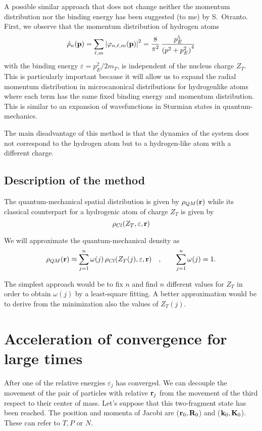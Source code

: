  A possible similar approach that does not change neither the momentum
distribution nor the binding energy has been suggested (to me) by S.~Otranto. First, we observe
that the momentum distribution of hydrogen atoms
\begin{equation}\label{Q:class-momen-distr-hydro}
  \tilde{\rho}_{n}(\mathbf{p}) = \sum_{\ell, m} \left| \varphi_{n,\ell,m}(\mathbf{p})\right|^{2} 
  = \frac{8 }{\pi^{2}} \, \frac{p_{E}^{5}}{\left( p^{2} + p_{E}^{2} \right)^{4}}
\end{equation}
with the binding energy $\varepsilon=p_{E}^{2}/2 m_{T}$, is independent of the
nucleus charge $Z_{T}$. This is particularly important because it will allow us
to expand the radial momentum distribution in microcanonical distributions for
hydrogenlike atoms where each term has the same fixed binding energy and
momentum distribution. This is similar to an expansion of wavefunctions in
Sturmian states in quantum-mechanics.

The main disadvantage of this method is that the dynamics of the system does not
correspond to the hydrogen atom but to a hydrogen-like atom with a different
charge.

\subsection{Description of the method}
\label{S:description-method}

The quantum-mechanical spatial distribution is given by $\rho_{QM}(\mathbf{r})$
while its classical counterpart for a hydrogenic atom of charge $Z_{T}$ is given by
\begin{equation}\label{Q:class-spati-distr-hydro}
  \rho_{Cl}(Z_{T}, \varepsilon, \mathbf{r})
\end{equation}

We will approximate the quantum-mechanical density as
\begin{equation}\label{Q:fitti-densi}
  \rho_{QM}(\mathbf{r}) \approx \sum_{j=1}^{n} \omega(j) \, \rho_{Cl}(Z_{T}(j), \varepsilon, \mathbf{r}) \quad, \qquad
  \sum_{j=1}^{n} \omega(j) = 1.
\end{equation}

The simplest approach would be to fix $n$ and find $n$  different values for $Z_{T}$ in order to
obtain $\omega(j)$ by a least-square fitting. A better approximation would be to
derive from the minimization also the values of $Z_{T}(j)$.

\section{Acceleration of convergence for large times}
After one of the relative energies $\varepsilon_{j}$ has converged. We
can decouple the movement of the pair of particles with relative
$\mathbf{r}_{j}$ from the movement of the third respect to their center of
mass. Let's suppose that this two-fragment state has been reached. The
position and momenta of Jacobi are ($\mathbf{r}_{0},\mathbf{R}_{0}$) and
($\mathbf{k}_{0},\mathbf{K}_{0}$). These can refer to $T,P$ or $N$.

